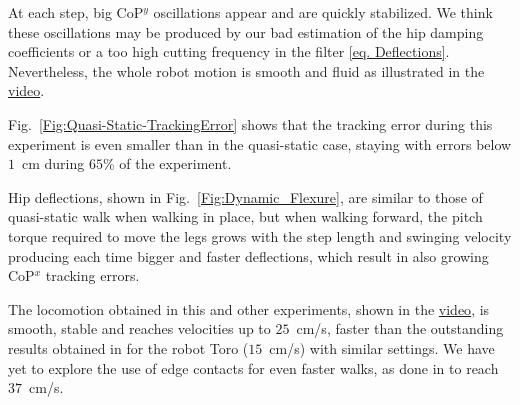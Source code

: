 \documentclass[letterpaper, 10 pt, conference]{ieeeconf}  %
\begin{document}

At each step, big CoP$^y$ oscillations appear and are quickly stabilized. We think these oscillations may be produced by our bad estimation of the hip damping coefficients or a too high cutting frequency in the filter \eqref{eq. Deflections}. Nevertheless, the whole robot motion is smooth and fluid as illustrated in the \href{https://gepettoweb.laas.fr/articles/talos_centroidal_mpc_torque_control.html}{video}.

Fig.~\ref{Fig:Quasi-Static-TrackingError} shows that the tracking error during this experiment is even smaller than in the quasi-static case, staying with errors below $1$~cm during $65$\% of the experiment.

Hip deflections, shown in Fig.~\ref{Fig:Dynamic_Flexure}, are similar to those of quasi-static walk when walking in place, but when walking forward, the pitch torque required to move the legs grows with the step length and swinging velocity producing each time bigger and faster deflections, which result in also growing CoP$^x$ tracking errors.

%


The locomotion obtained in this and other experiments, shown in the \href{https://gepettoweb.laas.fr/articles/talos_centroidal_mpc_torque_control.html}{video}, is smooth, stable and reaches velocities up to $25$~cm/s, faster than the outstanding results obtained in \cite{MesesanEGOA19} for the robot Toro ($15$~cm/s) with similar settings. We have yet to explore the use of edge contacts for even faster walks, as done in \cite{MesesanEGOA19} to reach $37$~cm/s.
\end{document}
